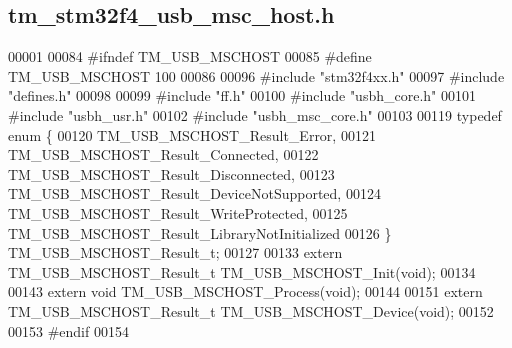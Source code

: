 \hypertarget{tm__stm32f4__usb__msc__host_8h_source}{}\subsection{tm\+\_\+stm32f4\+\_\+usb\+\_\+msc\+\_\+host.\+h}

\begin{DoxyCode}
00001 
00084 \textcolor{preprocessor}{#ifndef TM\_USB\_MSCHOST}
00085 \textcolor{preprocessor}{#define TM\_USB\_MSCHOST  100}
00086 
00096 \textcolor{preprocessor}{#include "stm32f4xx.h"}
00097 \textcolor{preprocessor}{#include "defines.h"}
00098 
00099 \textcolor{preprocessor}{#include "ff.h"}
00100 \textcolor{preprocessor}{#include "usbh\_core.h"}
00101 \textcolor{preprocessor}{#include "usbh\_usr.h"}
00102 \textcolor{preprocessor}{#include "usbh\_msc\_core.h"}
00103 
00119 \textcolor{keyword}{typedef} \textcolor{keyword}{enum} \{
00120     TM\_USB\_MSCHOST\_Result\_Error,
00121     TM\_USB\_MSCHOST\_Result\_Connected,
00122     TM\_USB\_MSCHOST\_Result\_Disconnected,
00123     TM\_USB\_MSCHOST\_Result\_DeviceNotSupported,
00124     TM\_USB\_MSCHOST\_Result\_WriteProtected,
00125     TM\_USB\_MSCHOST\_Result\_LibraryNotInitialized
00126 \} TM\_USB\_MSCHOST\_Result\_t;
00127 
00133 \textcolor{keyword}{extern} TM\_USB\_MSCHOST\_Result\_t TM\_USB\_MSCHOST\_Init(\textcolor{keywordtype}{void});
00134 
00143 \textcolor{keyword}{extern} \textcolor{keywordtype}{void} TM\_USB\_MSCHOST\_Process(\textcolor{keywordtype}{void});
00144 
00151 \textcolor{keyword}{extern} TM\_USB\_MSCHOST\_Result\_t TM\_USB\_MSCHOST\_Device(\textcolor{keywordtype}{void});
00152 
00153 \textcolor{preprocessor}{#endif}
00154 
\end{DoxyCode}
